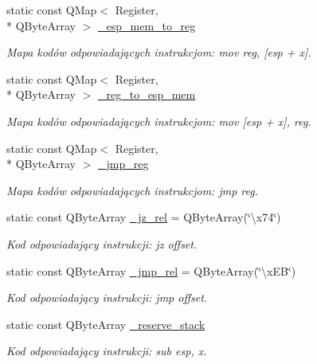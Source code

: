 \begin{DoxyCompactItemize}
static const Q\-Map$<$ Register, \\*
Q\-Byte\-Array $>$ \hyperlink{class_code_defines_a500b8a706cedd1af746d05cfbb43cf0b}{\-\_\-esp\-\_\-mem\-\_\-to\-\_\-reg}
\begin{DoxyCompactList}\small\item\em Mapa kodów odpowiadających instrukcjom\-: mov reg, \mbox{[}esp + x\mbox{]}. \end{DoxyCompactList}\item 
static const Q\-Map$<$ Register, \\*
Q\-Byte\-Array $>$ \hyperlink{class_code_defines_a866f6d3f2142fce7db16fe897fe48b76}{\-\_\-reg\-\_\-to\-\_\-esp\-\_\-mem}
\begin{DoxyCompactList}\small\item\em Mapa kodów odpowiadających instrukcjom\-: mov \mbox{[}esp + x\mbox{]}, reg. \end{DoxyCompactList}\item 
static const Q\-Map$<$ Register, \\*
Q\-Byte\-Array $>$ \hyperlink{class_code_defines_a15c9e1c6383c846bf240d3de47d63424}{\-\_\-jmp\-\_\-reg}
\begin{DoxyCompactList}\small\item\em Mapa kodów odpowiadających instrukcjom\-: jmp reg. \end{DoxyCompactList}\item 
static const Q\-Byte\-Array \hyperlink{class_code_defines_adf4c7713c104164cb72d122d4478498e}{\-\_\-jz\-\_\-rel} = Q\-Byte\-Array(\char`\"{}\textbackslash{}x74\char`\"{})
\begin{DoxyCompactList}\small\item\em Kod odpowiadający instrukcji\-: jz offset. \end{DoxyCompactList}\item 
static const Q\-Byte\-Array \hyperlink{class_code_defines_a3148e9473e27ad97b441d911e643dd63}{\-\_\-jmp\-\_\-rel} = Q\-Byte\-Array(\char`\"{}\textbackslash{}x\-E\-B\char`\"{})
\begin{DoxyCompactList}\small\item\em Kod odpowiadający instrukcji\-: jmp offset. \end{DoxyCompactList}\item 
static const Q\-Byte\-Array \hyperlink{class_code_defines_af7595fd95c2c9b4ea2f83cf2946f23e2}{\-\_\-reserve\-\_\-stack}
\begin{DoxyCompactList}\small\item\em Kod odpowiadający instrukcji\-: sub esp, x. \end{DoxyCompactList}\item 

\end{DoxyCompactItemize}
